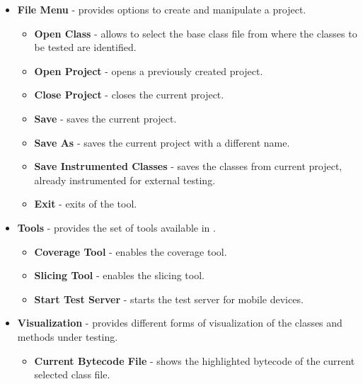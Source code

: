 \begin{itemize}
    \item \textbf{File Menu} - provides options to create and
    manipulate a \toolname project.
        \begin{itemize}
            \item \textbf{Open Class} - allows to select the base class
            file from where the classes to be tested are
            identified.

            \item \textbf{Open Project} - opens a previously created
            project.

            \item \textbf{Close Project} - closes the current
            project.

            \item \textbf{Save} - saves the current project.

            \item \textbf{Save As} - saves the current project with a different
            name.
            
            \item \textbf{Save Instrumented Classes} - saves the classes from 
            current project, already instrumented for external testing.

            \item \textbf{Exit} - exits of the tool.
        \end{itemize}

    \item \textbf{Tools} - provides the set of tools available in
    \toolname.
        \begin{itemize}
            \item \textbf{Coverage Tool} - enables the \toolname coverage
            tool.

            \item \textbf{Slicing Tool} - enables the \toolname slicing
            tool.
            
            \item \textbf{Start Test Server} - starts the test server for
            mobile devices.

        \end{itemize}

    \item \textbf{Visualization} - provides different forms of
    visualization of the classes and methods under testing.
        \begin{itemize}
            \item \textbf{Current Bytecode File} - shows the highlighted bytecode of the
            current selected class file.


\end{itemize}
\end{itemize}
